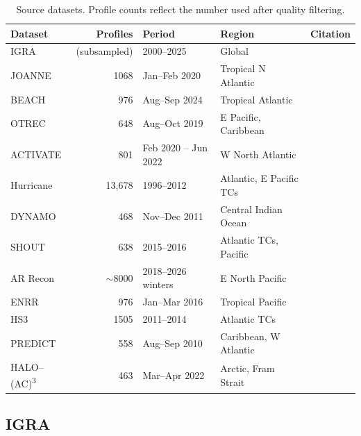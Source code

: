 \documentclass[11pt]{article}
\begin{document}
\begin{table}[h]
\centering
\caption{Source datasets.  Profile counts reflect the number used after quality filtering.}
\label{tab:datasets}
\small
\begin{tabular}{lrlll}
\toprule
Dataset & Profiles & Period & Region & Citation \\
\midrule
IGRA              & (subsampled) & 2000--2025                & Global                     & \citet{durre2006} \\
JOANNE            & 1068         & Jan--Feb 2020              & Tropical N Atlantic        & \citet{george2021} \\
BEACH             & 976          & Aug--Sep 2024              & Tropical Atlantic          & \citet{gloeckner2025} \\
OTREC             & 648          & Aug--Oct 2019              & E Pacific, Caribbean       & \citet{vomel2021} \\
ACTIVATE          & 801          & Feb 2020 -- Jun 2022       & W North Atlantic           & \citet{vomel2023activate} \\
Hurricane         & 13{,}678     & 1996--2012                 & Atlantic, E Pacific TCs    & \citet{wang2015} \\
DYNAMO            & 468          & Nov--Dec 2011              & Central Indian Ocean       & \citet{ciesielski2014} \\
SHOUT             & 638          & 2015--2016                 & Atlantic TCs, Pacific      & \citet{wick2020} \\
AR Recon          & ${\sim}$8000 & 2018--2026 winters         & E North Pacific            & \citet{cobb2022} \\
ENRR              & 976          & Jan--Mar 2016              & Tropical Pacific           & \citet{dole2018} \\
HS3               & 1505         & 2011--2014                 & Atlantic TCs               & \citet{braun2016} \\
PREDICT           & 558          & Aug--Sep 2010              & Caribbean, W Atlantic      & \citet{montgomery2012} \\
HALO--(AC)\textsuperscript{3}  & 463 & Mar--Apr 2022          & Arctic, Fram Strait        & \citet{ehrlich2025} \\
\bottomrule
\end{tabular}
\end{table}

\subsection{IGRA}
\end{document}
